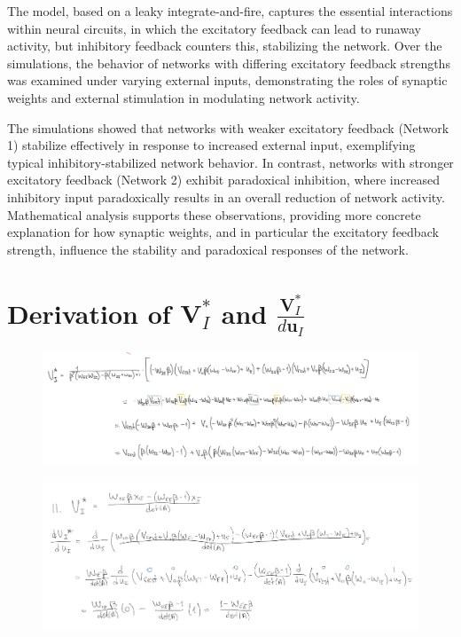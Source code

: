 \documentclass[10pt,twocolumn]{article}
\begin{document}
The model, based on a leaky integrate-and-fire, captures the essential 
interactions within neural circuits, in which the excitatory feedback can lead to 
runaway activity, but inhibitory feedback counters this, stabilizing the network. 
Over the simulations, the behavior of networks with differing excitatory feedback strengths was 
examined under varying external inputs, demonstrating the roles of synaptic weights and external 
stimulation in modulating network activity.

The simulations showed that networks with weaker excitatory feedback (Network 1) stabilize 
effectively in response to increased external input, exemplifying typical inhibitory-stabilized 
network behavior. In contrast, networks with stronger excitatory feedback (Network 2) 
exhibit paradoxical inhibition, where increased inhibitory input paradoxically results 
in an overall reduction of network activity. Mathematical analysis supports these observations, 
providing more concrete explanation for how synaptic weights, and in particular the 
excitatory feedback strength, influence the stability 
and paradoxical responses of the network. 


\clearpage
\printbibliography

\clearpage
\appendix
\section{Derivation of $\textbf{V}^\ast_I$ and $\frac{\textbf{V}^\ast_I}{d\textbf{u}_I}$}
\begin{figure}[ht]
    \centering
    \captionsetup{justification=centering}
    \includegraphics[width=1\textwidth]{images/Vi_derivation.png}
    \label{fig:vi-derivation}
\end{figure}
\begin{figure}[ht]
    \centering
    \captionsetup{justification=centering}
    \includegraphics[width=1\textwidth]{images/dvi_derivation.png}
    \label{fig:dvi-derivation}
\end{figure}
\clearpage
\end{document}
